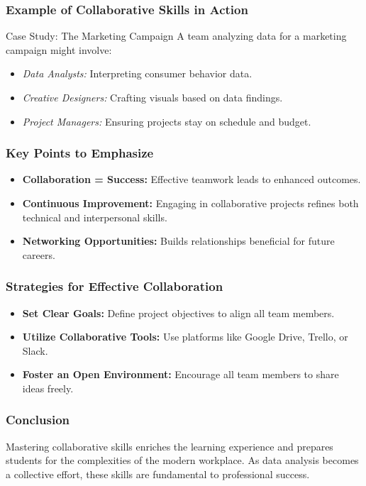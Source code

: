 \documentclass[aspectratio=169]{beamer}
\begin{document}
\begin{frame}[fragile]
    \frametitle{Example of Collaborative Skills in Action}
    \begin{block}{Case Study: The Marketing Campaign}
        A team analyzing data for a marketing campaign might involve:
        \begin{itemize}
            \item \textit{Data Analysts:} Interpreting consumer behavior data.
            \item \textit{Creative Designers:} Crafting visuals based on data findings.
            \item \textit{Project Managers:} Ensuring projects stay on schedule and budget.
        \end{itemize}
    \end{block}
\end{frame}

\begin{frame}[fragile]
    \frametitle{Key Points to Emphasize}
    \begin{itemize}
        \item \textbf{Collaboration = Success:} Effective teamwork leads to enhanced outcomes.
        \item \textbf{Continuous Improvement:} Engaging in collaborative projects refines both technical and interpersonal skills.
        \item \textbf{Networking Opportunities:} Builds relationships beneficial for future careers.
    \end{itemize}
\end{frame}

\begin{frame}[fragile]
    \frametitle{Strategies for Effective Collaboration}
    \begin{itemize}
        \item \textbf{Set Clear Goals:} Define project objectives to align all team members.
        \item \textbf{Utilize Collaborative Tools:} Use platforms like Google Drive, Trello, or Slack.
        \item \textbf{Foster an Open Environment:} Encourage all team members to share ideas freely.
    \end{itemize}
\end{frame}

\begin{frame}[fragile]
    \frametitle{Conclusion}
    Mastering collaborative skills enriches the learning experience and prepares students for the complexities of the modern workplace. As data analysis becomes a collective effort, these skills are fundamental to professional success.
\end{frame}
\end{document}
